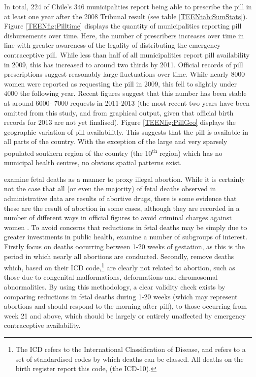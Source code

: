In total, 224 of Chile's 346 municipalities report being able to prescribe the 
pill in at least one year after the 2008 Tribunal result (see table 
\ref{TEENtab:SumStats}). Figure \ref{TEENfig:Pilltime} displays the quantity
of municipalities reporting pill disbursements over time.  Here, the number
of prescribers increases over time in line with greater awareness of the legality 
of distributing the emergency contraceptive pill.  While less than half of all
municipalities report pill availability in 2009, this has increased to around
two thirds by 2011.  Official records of pill prescriptions suggest reasonably
large fluctuations over time.  While nearly 8000 women were reported as 
requesting the pill in 2009, this fell to slightly under 4000 the following
year.  Recent figures suggest that this number has been stable at around 6000-%
7000 requests in 2011-2013 (the most recent two years have been omitted from
this study, and from graphical output, given that official birth records for
2013 are not yet finalised).  Figure \ref{TEENfig:PillGeo} displays
the geographic variation of pill availabilitly.  This suggests that the pill
is available in all parts of the country. With the exception of the large and 
very sparsely populated southern region of the country (the 
10\textsuperscript{th} region) which has no municipal health centres, no 
obvious spatial patterns exist.

\Person examine fetal deaths as a manner to proxy illegal abortion.  While it 
is certainly not the case that all (or even the majority) of fetal deaths 
observed in administrative data are results of abortive drugs, there is some
evidence that these are the result of abortion in some cases, although they are 
recorded in a number of different ways in official figures to avoid criminal 
charges against women \citep{ShepardCasas2007}.  To avoid concerns that 
reductions in fetal deaths may be simply due to greater investments in public
health, \person examine a number of subgroups of interest.  Firstly \person focus 
on deaths occurring between 1-20 weeks of gestation, as this is the period in 
which nearly all abortions are conducted.  Secondly, \person remove deaths which,
based on their ICD code,\footnote{The ICD refers to the International 
Classification of Disease, and refers to a set of standardised codes by which
deaths can be classed.  All deaths on the birth register report this code,
(the ICD-10).} are clearly not related to abortion, such as those due to 
congenital malformations, deformations and chromosomal abnormalities.  By
using this methodology, a clear validity check exists by comparing reductions
in fetal deaths during 1-20 weeks (which may represent abortions and should
respond to the morning after pill), to those occurring from week 21 and above,
which should be largely or entirely unaffected by emergency contraceptive
availability.


